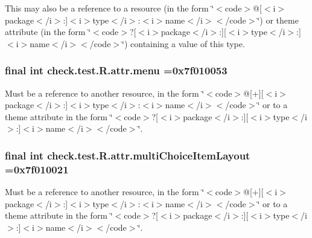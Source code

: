 This may also be a reference to a resource (in the form \char`\"{}$<$code$>$@\mbox{[}$<$i$>$package$<$/i$>$\+:\mbox{]}$<$i$>$type$<$/i$>$\+:$<$i$>$name$<$/i$>$$<$/code$>$\char`\"{}) or theme attribute (in the form \char`\"{}$<$code$>$?\mbox{[}$<$i$>$package$<$/i$>$\+:\mbox{]}\mbox{[}$<$i$>$type$<$/i$>$\+:\mbox{]}$<$i$>$name$<$/i$>$$<$/code$>$\char`\"{}) containing a value of this type. \hypertarget{classcheck_1_1test_1_1_r_1_1attr_ae21b02ab52e1c279c8bcb58948757072}{}
\subsubsection[{menu}]{\setlength{\rightskip}{0pt plus 5cm}final int check.\+test.\+R.\+attr.\+menu =0x7f010053\hspace{0.3cm}{\ttfamily [static]}}\label{classcheck_1_1test_1_1_r_1_1attr_ae21b02ab52e1c279c8bcb58948757072}
Must be a reference to another resource, in the form \char`\"{}$<$code$>$@\mbox{[}+\mbox{]}\mbox{[}$<$i$>$package$<$/i$>$\+:\mbox{]}$<$i$>$type$<$/i$>$\+:$<$i$>$name$<$/i$>$$<$/code$>$\char`\"{} or to a theme attribute in the form \char`\"{}$<$code$>$?\mbox{[}$<$i$>$package$<$/i$>$\+:\mbox{]}\mbox{[}$<$i$>$type$<$/i$>$\+:\mbox{]}$<$i$>$name$<$/i$>$$<$/code$>$\char`\"{}. \hypertarget{classcheck_1_1test_1_1_r_1_1attr_adbcd6700f598b96667bb355328873eee}{}
\subsubsection[{multi\+Choice\+Item\+Layout}]{\setlength{\rightskip}{0pt plus 5cm}final int check.\+test.\+R.\+attr.\+multi\+Choice\+Item\+Layout =0x7f010021\hspace{0.3cm}{\ttfamily [static]}}\label{classcheck_1_1test_1_1_r_1_1attr_adbcd6700f598b96667bb355328873eee}
Must be a reference to another resource, in the form \char`\"{}$<$code$>$@\mbox{[}+\mbox{]}\mbox{[}$<$i$>$package$<$/i$>$\+:\mbox{]}$<$i$>$type$<$/i$>$\+:$<$i$>$name$<$/i$>$$<$/code$>$\char`\"{} or to a theme attribute in the form \char`\"{}$<$code$>$?\mbox{[}$<$i$>$package$<$/i$>$\+:\mbox{]}\mbox{[}$<$i$>$type$<$/i$>$\+:\mbox{]}$<$i$>$name$<$/i$>$$<$/code$>$\char`\"{}. \hypertarget{classcheck_1_1test_1_1_r_1_1attr_a9bbeac1a500649466bdd64ac1ef20ca8}{}
